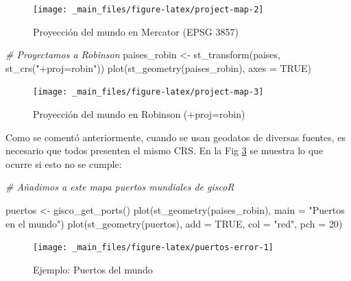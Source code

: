 \documentclass[
]{report}
\newenvironment{Shaded}{\begin{snugshade}}{\end{snugshade}}
\newcommand{\AttributeTok}[1]{\textcolor[rgb]{0.77,0.63,0.00}{#1}}
\newcommand{\CommentTok}[1]{\textcolor[rgb]{0.56,0.35,0.01}{\textit{#1}}}
\newcommand{\ConstantTok}[1]{\textcolor[rgb]{0.00,0.00,0.00}{#1}}
\newcommand{\DecValTok}[1]{\textcolor[rgb]{0.00,0.00,0.81}{#1}}
\newcommand{\FunctionTok}[1]{\textcolor[rgb]{0.00,0.00,0.00}{#1}}
\newcommand{\NormalTok}[1]{#1}
\newcommand{\OtherTok}[1]{\textcolor[rgb]{0.56,0.35,0.01}{#1}}
\newcommand{\StringTok}[1]{\textcolor[rgb]{0.31,0.60,0.02}{#1}}
\begin{document}
\begin{figure}

{\centering \texttt{[image: \_main\_files/figure-latex/project-map-2]} 

}

\caption{Proyección del mundo en Mercator (EPSG 3857)}\label{fig:project-map-2}
\end{figure}

\begin{Shaded}
\begin{Highlighting}[]
\CommentTok{\# Proyectamos a Robinson}
\NormalTok{paises\_robin }\OtherTok{\textless{}{-}} \FunctionTok{st\_transform}\NormalTok{(paises, }\FunctionTok{st\_crs}\NormalTok{(}\StringTok{"+proj=robin"}\NormalTok{))}
\FunctionTok{plot}\NormalTok{(}\FunctionTok{st\_geometry}\NormalTok{(paises\_robin), }\AttributeTok{axes =} \ConstantTok{TRUE}\NormalTok{)}
\end{Highlighting}
\end{Shaded}

\begin{figure}

{\centering \texttt{[image: \_main\_files/figure-latex/project-map-3]} 

}

\caption{Proyección del mundo en Robinson (+proj=robin)}\label{fig:project-map-3}
\end{figure}

Como se comentó anteriormente, cuando se usan geodatos de diversas fuentes, es
necesario que todos presenten el mismo CRS. En la Fig \ref{fig:puertos-error}
se muestra lo que ocurre si esto no se cumple:

\begin{Shaded}
\begin{Highlighting}[]
\CommentTok{\# Añadimos a este mapa puertos mundiales de giscoR}

\NormalTok{puertos }\OtherTok{\textless{}{-}} \FunctionTok{gisco\_get\_ports}\NormalTok{()}
\FunctionTok{plot}\NormalTok{(}\FunctionTok{st\_geometry}\NormalTok{(paises\_robin), }\AttributeTok{main =} \StringTok{"Puertos en el mundo"}\NormalTok{)}
\FunctionTok{plot}\NormalTok{(}\FunctionTok{st\_geometry}\NormalTok{(puertos), }\AttributeTok{add =} \ConstantTok{TRUE}\NormalTok{, }\AttributeTok{col =} \StringTok{"red"}\NormalTok{, }\AttributeTok{pch =} \DecValTok{20}\NormalTok{)}
\end{Highlighting}
\end{Shaded}

\begin{figure}

{\centering \texttt{[image: \_main\_files/figure-latex/puertos-error-1]} 

}

\caption{Ejemplo: Puertos del mundo}\label{fig:puertos-error}
\end{figure}
\end{document}
